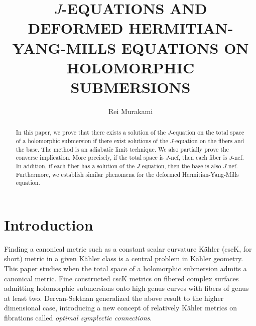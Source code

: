 \documentclass{amsart}
\author[R.\ Murakami]{Rei Murakami}
\numberwithin{equation}{section}
\theoremstyle{plain}
\theoremstyle{definition}
\theoremstyle{remark}
\begin{document}
\title[$J$-EQUATIONS AND DHYM EQUATIONS ON HOLOMORPHIC SUBMERSIONS]{$J$-EQUATIONS AND DEFORMED HERMITIAN-YANG-MILLS EQUATIONS ON HOLOMORPHIC SUBMERSIONS}

\begin{abstract} 
In this paper, we prove that there exists a solution of the $J$-equation on the total space of a holomorphic submersion if there exist solutions of the $J$-equation on the fibers and the base.
The method is an adiabatic limit technique. 
We also partially prove the converse implication. More precisely, if the total space is $J$-nef, then each fiber is $J$-nef. In addition, if each fiber has a solution of the $J$-equation, then the base is also $J$-nef. 
Furthermore, we establish similar phenomena for the deformed Hermitian-Yang-Mills equation.
\end{abstract}

\maketitle

\section{Introduction}\label{sec:Introduction}
 
 Finding a canonical metric such as a constant scalar curvature K{\"a}hler (cscK, for short) metric in a given K{\"a}hler class is a central problem in K{\"a}hler geometry. 
This paper studies when the total space of a holomorphic submersion admits a canonical metric. Fine \cite{Fine} constructed cscK metrics on fibered complex surfaces admitting holomorphic submersions onto high genus curves with fibers of genus at least two.
Dervan-Sektnan \cite{Dervan-Sektnan} generalized the above result to the higher dimensional case, introducing a new concept of relatively K{\"a}hler metrics on fibrations called \textit{optimal symplectic connections}.
 
\end{document}
